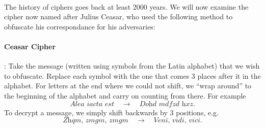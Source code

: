 \documentclass{article}
\theoremstyle{definition}
\theoremstyle{example}
\begin{document}
\paragraph{}
The history of ciphers goes back at least 2000 years. We will now examine the
cipher now named after Julius Ceasar, who used the following method to obfuscate
his correspondance for his adversaries:
\paragraph{Ceasar Cipher}: Take the message (written using symbols from the
Latin alphabet) that we wish to obfuscate. Replace each symbol with the one that
comes 3 places after it in the alphabet. For letters at the end where we could
not shift, we ``wrap around'' to the beginning of the alphabet and carry on
counting from there. For example
\[
  \textit{Alea iacta est} \quad\to\quad \textit{Dohd mdfzd hxz}.
\]
To decrypt a message, we simply shift backwards by 3 positions, e.g.
\[
  \textit{Zhqm, zmgm, zmgm} \quad\to\quad \textit{Veni, vidi, vici}.
\]
\end{document}
